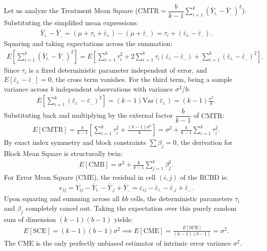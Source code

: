 \begin{solproblema}
\begin{enumerate}
		Let us analyze the Treatment Mean Square ($\text{CMTR} = \dfrac{b}{k-1}\sum_{i=1}^k (\bar{Y}_{i.} - \bar{Y}_{..})^2$):
		Substituting the simplified mean expressions:
		\begin{align}
			\bar{Y}_{i.} - \bar{Y}_{..} = (\mu + \tau_i + \bar{\varepsilon}_{i.}) - (\mu + \bar{\varepsilon}_{..}) = \tau_i + (\bar{\varepsilon}_{i.} - \bar{\varepsilon}_{..}).
		\end{align}
		Squaring and taking expectations across the summation:
		\begin{align}
			E\left[ \sum_{i=1}^k (\bar{Y}_{i.} - \bar{Y}_{..})^2 \right] = E\left[ \sum_{i=1}^k \tau_i^2 + 2\sum_{i=1}^k \tau_i (\bar{\varepsilon}_{i.} - \bar{\varepsilon}_{..}) + \sum_{i=1}^k (\bar{\varepsilon}_{i.} - \bar{\varepsilon}_{..})^2 \right].
		\end{align}
		Since $\tau_i$ is a fixed deterministic parameter independent of error, and $E[\bar{\varepsilon}_{i.} - \bar{\varepsilon}_{..}] = 0$, the cross term vanishes. For the third term, being a sample variance across $b$ independent observations with variance $\sigma^2/b$:
		\begin{align}
			E\left[ \sum_{i=1}^k (\bar{\varepsilon}_{i.} - \bar{\varepsilon}_{..})^2 \right] = (k - 1) \text{Var}(\bar{\varepsilon}_{i.}) = (k - 1) \frac{\sigma^2}{b}.
		\end{align}
		Substituting back and multiplying by the external factor $\dfrac{b}{k-1}$ of $\text{CMTR}$:
		\begin{align}
			E[\text{CMTR}] = \frac{b}{k-1} \left[ \sum_{i=1}^k \tau_i^2 + \frac{(k-1)\sigma^2}{b} \right] = \sigma^2 + \frac{b}{k-1}\sum_{i=1}^k \tau_i^2.
		\end{align}
		By exact index symmetry and block constraints $\sum \beta_j = 0$, the derivation for Block Mean Square is structurally twin:
		\begin{align}
			E[\text{CMB}] = \sigma^2 + \frac{k}{b-1}\sum_{j=1}^b \beta_j^2.
		\end{align}
		For Error Mean Square ($\text{CME}$), the residual in cell $(i,j)$ of the RCBD is:
		\begin{align}
			e_{ij} = Y_{ij} - \bar{Y}_{i.} - \bar{Y}_{.j} + \bar{Y}_{..} = \varepsilon_{ij} - \bar{\varepsilon}_{i.} - \bar{\varepsilon}_{.j} + \bar{\varepsilon}_{..}.
		\end{align}
		Upon squaring and summing across all $kb$ cells, the deterministic parameters $\tau_i$ and $\beta_j$ completely cancel out. Taking the expectation over this purely random sum of dimension $(k-1)(b-1)$ yields:
		\begin{align}
			E[\text{SCE}] = (k - 1)(b - 1) \sigma^2 \implies E[\text{CME}] = \frac{E[\text{SCE}]}{(k-1)(b-1)} = \sigma^2.
		\end{align}
		The $\text{CME}$ is the only perfectly unbiased estimator of intrinsic error variance $\sigma^2$.
		

\end{enumerate}
\end{solproblema}
